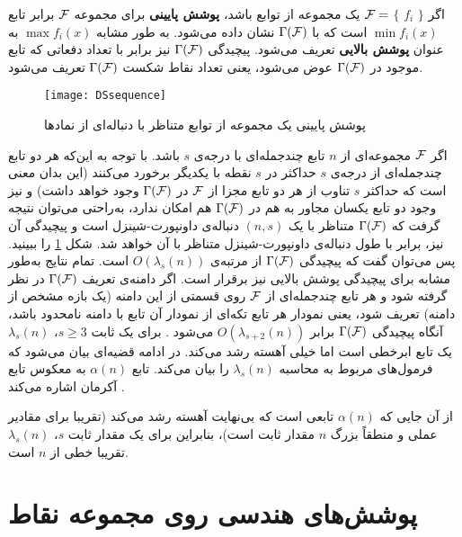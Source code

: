 اگر $\rbrace$ $f_{i}$ $ \lbrace$ $\cal F =$
  یک مجموعه از توابع باشد،  \textbf{ پوشش پایینی}  برای مجموعه $\cal F$  برابر تابع $\min f_{i}(x)$ است که با  $\Gamma(\cal F)$ نشان داده می‌شود.  به طور مشابه  $\max f_{i}(x)$ به عنوان \textbf{پوشش بالایی}  تعریف می‌شود. پیچیدگی $\Gamma(\cal F)$ نیز برابر با تعداد دفعاتی که تابع موجود در $\Gamma(\cal F)$ عوض می‌شود، یعنی تعداد نقاط شکست $\Gamma(\cal F)$ تعریف می‌شود. 

\begin{figure}[h]
\begin{center}
\texttt{[image: DSsequence]}
\end{center}
\caption{پوشش پایینی یک مجموعه از توابع متناظر با دنباله‌ای از نمادها}
\label{fig-DSsequence}
\end{figure}
اگر $\cal F$ مجموعه‌ای از $n$ تابع چندجمله‌ای با درجه‌ی $s$ باشد. با توجه به این‌که هر دو تابع چندجمله‌ای از درجه‌ی $s$ حداکثر در $s$ نقطه با یکدیگر برخورد می‌کنند (این بدان معنی است که حداکثر $s$ تناوب از هر دو تابع مجزا از $\cal F$  در $\Gamma(\cal F)$ وجود خواهد داشت) و نیز وجود دو تابع یکسان مجاور به هم در $\Gamma(\cal F)$ هم امکان ندارد، به‌راحتی می‌توان نتیجه گرفت که $\Gamma(\cal F)$ متناظر با یک $(n, s)$ دنباله‌ی داونپورت-شینزل است و پیچیدگی آن نیز، برابر با طول دنباله‌ی داونپورت-شینزل متناظر با آن خواهد شد. شکل \ref{fig-DSsequence} را ببینید. پس می‌توان گفت که پیچیدگی $\Gamma(\cal F)$ از مرتبه‌ی $O(\lambda_{s}(n))$ است. تمام نتایج به‌طور مشابه برای پیچیدگی پوشش بالایی نیز برقرار است. اگر دامنه‌ی تعریف $\Gamma(\cal F)$ در نظر گرفته شود و هر تابع چندجمله‌ای از $\cal F$  روی قسمتی از این دامنه (یک بازه مشخص از دامنه) تعریف شود، یعنی نمودار هر تابع تکه‌ای از نمودار آن تابع با دامنه نامحدود باشد، آنگاه پیچیدگی $ \Gamma(\cal F)$ برابر $O(\lambda_{s+2}(n))$ می‌شود \cite{sp-dssga-95}.
برای یک ثابت $s\geq 3$، $\lambda_{s}(n)$ یک تابع ابرخطی است اما خیلی آهسته رشد می‌کند. در ادامه قضیه‌ای بیان می‌شود که فرمول‌های مربوط به محاسبه  $\lambda_{s}(n)$ را بیان می‌کند. تابع $\alpha(n)$  به معکوس تابع آکرمان اشاره می‌کند \cite{sp-dssga-95}.


از آن جایی که $\alpha(n)$ تابعی است که بی‌نهایت آهسته رشد می‌کند (تقریبا برای مقادیر عملی و منطقاً بزرگ $n$ مقدار ثابت است)، بنابراین برای یک مقدار ثابت $s$، $\lambda_{s}(n)$ تقریبا خطی از $n$  است.   
\section{پوشش‌های هندسی روی مجموعه نقاط}\label{sec-t-spann}
